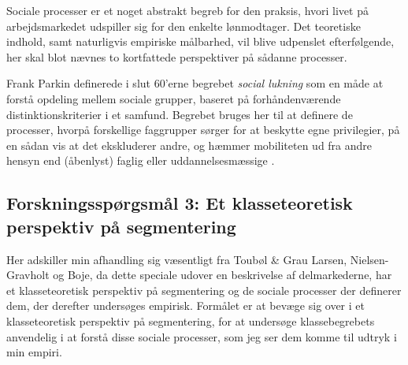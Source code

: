 Sociale processer er et noget abstrakt begreb for den praksis, hvori livet på arbejdsmarkedet udspiller sig for den enkelte lønmodtager. Det teoretiske indhold, samt naturligvis empiriske målbarhed, vil blive udpenslet efterfølgende, her skal blot nævnes to kortfattede perspektiver på sådanne processer.

Frank Parkin definerede i slut 60'erne begrebet \emph{social lukning} som en måde at forstå opdeling mellem sociale grupper, baseret på forhåndenværende distinktionskriterier i et samfund. Begrebet bruges her til at definere de processer, hvorpå forskellige faggrupper sørger for at beskytte egne privilegier, på en sådan vis at det ekskluderer andre, og hæmmer mobiliteten ud fra andre hensyn end (åbenlyst) faglig eller uddannelsesmæssige \parencite{Parkin1994}. 



\subsection{Forskningsspørgsmål 3:  Et klasseteoretisk perspektiv på segmentering}

Her adskiller min afhandling sig væsentligt fra Toubøl \& Grau Larsen, Nielsen-Gravholt og Boje, da dette speciale udover en beskrivelse af delmarkederne, har et klasseteoretisk perspektiv på segmentering og de sociale processer der definerer dem, der derefter undersøges empirisk. Formålet er at bevæge sig over i et klasseteoretisk perspektiv på segmentering, for at undersøge klassebegrebets anvendelig i at forstå disse sociale processer, som jeg ser dem komme til udtryk i min empiri. 

